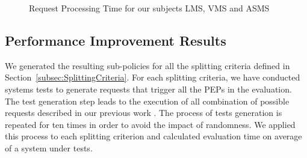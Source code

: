 \begin{figure}[h!]
  \centering
  \caption{Request Processing Time for our subjects LMS, VMS and ASMS}
  \label{fig:processing time}
\end{figure}

\subsection{Performance Improvement Results}\label{subsec:performanceimprovement}

We generated the resulting sub-policies for all the splitting criteria defined in Section~\ref{subsec:SplittingCriteria}.
For each splitting criteria, we have conducted systems tests to generate requests that trigger all the PEPs in the evaluation. 
The test generation step leads to the execution of all combination of possible requests described in our previous work \cite{testcase}.  
The process of tests generation is repeated for ten times in order to avoid the impact of randomness.
We applied this process to each splitting criterion and calculated evaluation time on average of a system under tests.


